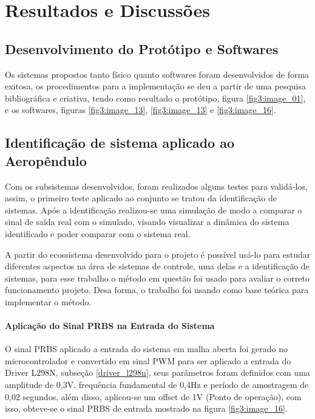 \chapter{Resultados e Discussões}
\label{cap_3}

\section{Desenvolvimento do Protótipo e Softwares}

Os sistemas propostos tanto físico quanto softwares foram desenvolvidos de forma exitosa, os procedimentos para a implementação se deu a partir de uma pesquisa bibliográfica e criativa, tendo como resultado o protótipo, figura \ref{fig3:image_01}, e os softwares, figuras \ref{fig3:image_13}, \ref{fig3:image_13} e \ref{fig3:image_16}.


\section{Identificação de sistema aplicado ao Aeropêndulo}
\label{indentificacao}

Com os subsistemas desenvolvidos, foram realizados alguns testes para validá-los, assim, o primeiro teste aplicado ao conjunto se tratou da identificação de sistemas. Após a identificação realizou-se uma simulação de modo a comparar o sinal de saída real com o simulado, visando visualizar a dinâmica do sistema identificado e poder comparar com o sistema real.

A partir do ecossistema desenvolvido para o projeto é possível usá-lo para estudar diferentes aspectos na área de sistemas de controle, uma delas e a identificação de sistemas, para esse trabalho o método em questão foi usado para avaliar o correto funcionamento projeto. Desa forma, o trabalho \cite{tcc_klarissa_ufpa} foi usando como base teórica para implementar o método.


\subsubsection{Aplicação do Sinal PRBS na Entrada do Sistema}

O sinal PRBS aplicado a entrada do sistema em malha aberta foi gerado no microcontrolador e convertido em sinal PWM para ser aplicado a entrada do Driver L298N, subseção \ref{driver_l298n}, seus parâmetros foram definidos com uma amplitude de 0,3V, frequência fundamental de 0,4Hz e período de amostragem de 0,02 segundos, além disso, aplicou-se um offset de 1V (Ponto de operação), com isso, obteve-se o sinal PRBS de entrada mostrado na figura \ref{fig3:image_16}.


